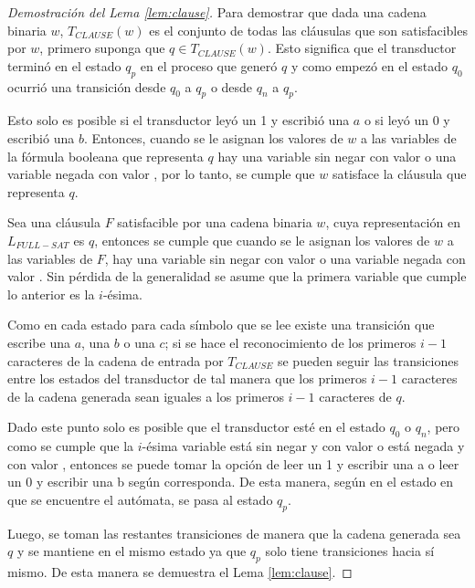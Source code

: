 \begin{proof}[Demostración del Lema \ref{lem:clause}]
    Para demostrar que dada una cadena binaria $w$, $T_{CLAUSE}(w)$ es el conjunto de todas las cláusulas que son satisfacibles por $w$, primero suponga que $q\in T_{CLAUSE}(w)$.  Esto significa que el transductor terminó en el estado $q_p$ en el proceso que generó $q$ y como empezó en el estado $q_0$ ocurrió una transición desde $q_0$ a $q_p$ o desde $q_n$ a $q_p$. 
    
    Esto solo es posible si el transductor leyó un 1 y escribió una $a$ o si leyó un 0 y escribió una $b$. Entonces, cuando se le asignan los valores de $w$ a las variables de la fórmula booleana que representa $q$ hay una variable sin negar con valor \true{} o una variable negada con valor \false{}, por lo tanto, se cumple que $w$ satisface la cláusula que representa $q$.
    
    Sea una cláusula $F$ satisfacible por una cadena binaria $w$, cuya representación en $L_{FULL-SAT}$ es $q$, entonces se cumple que 
    cuando se le asignan los valores de $w$ a las variables de $F$, hay una variable sin negar con valor \true{} o una variable negada con valor \false{}. Sin pérdida de la generalidad se asume que la primera variable que cumple 
    lo anterior es la $i$-ésima.  
    
    Como en cada estado para cada símbolo que se lee existe una transición que escribe una $a$, una $b$ o una $c$;
    si se hace el reconocimiento de los primeros $i-1$ caracteres de la cadena de entrada por $T_{CLAUSE}$
    se pueden seguir las transiciones entre los estados del transductor de tal manera que los primeros $i-1$
    caracteres de la cadena generada sean iguales a los primeros $i-1$ caracteres de $q$. 
    
    Dado este punto solo es posible que el transductor esté en el estado $q_0$ o $q_n$, pero como se cumple que la $i$-ésima variable está sin negar y con valor \true{} o está negada y con valor \false{}, entonces se puede tomar la opción de leer un 1 y escribir una a o leer un 0 y escribir una b según corresponda.  De esta manera, según en el estado en que se encuentre el autómata, se pasa al estado $q_p$.
    
    Luego, se toman las restantes transiciones de manera que la cadena generada sea $q$ y se mantiene en el mismo estado ya que $q_p$ solo tiene transiciones hacia sí mismo. De esta manera se demuestra el Lema \ref{lem:clause}. 
    
\end{proof}


